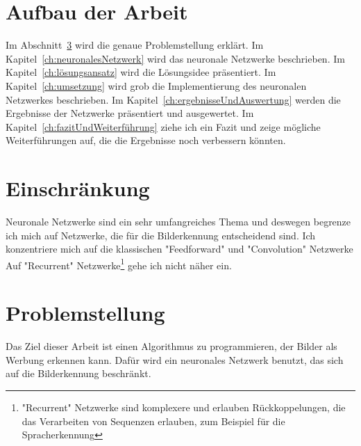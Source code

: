 \documentclass[12pt,a4paper]{report}
\begin{document}
\section{Aufbau der Arbeit}
\label{sec:aufbauDerArbeit}
Im Abschnitt~\ref{sec:problemstellung} wird die genaue Problemstellung erklärt.
Im Kapitel~\ref{ch:neuronalesNetzwerk} wird das neuronale Netzwerke beschrieben.
Im Kapitel~\ref{ch:lösungsansatz} wird die Lösungsidee präsentiert.
Im Kapitel~\ref{ch:umsetzung} wird grob die Implementierung des neuronalen Netzwerkes beschrieben.
Im Kapitel~\ref{ch:ergebnisseUndAuswertung} werden die Ergebnisse der Netzwerke präsentiert und ausgewertet.
Im Kapitel~\ref{ch:fazitUndWeiterführung} ziehe ich ein Fazit und zeige mögliche Weiterführungen auf, die die Ergebnisse noch verbessern könnten.

\section{Einschränkung}
Neuronale Netzwerke sind ein sehr umfangreiches Thema und deswegen begrenze ich mich auf Netzwerke, die für die Bilderkennung entscheidend sind.
Ich konzentriere mich auf die klassischen "Feedforward" und "Convolution" Netzwerke
Auf "Recurrent" Netzwerke\footnote{
"Recurrent" Netzwerke sind komplexere und erlauben Rückkoppelungen, die das Verarbeiten von Sequenzen erlauben, zum Beispiel für die Spracherkennung\cite{wiki:rnn}
} gehe ich nicht näher ein.

\section{Problemstellung}\label{sec:problemstellung}
Das Ziel dieser Arbeit ist einen Algorithmus zu programmieren, der Bilder als Werbung erkennen kann.
Dafür wird ein neuronales Netzwerk benutzt, das sich auf die Bilderkennung beschränkt.
\end{document}
